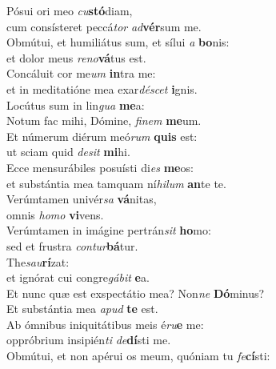 \evenverse Pósui ori meo \textit{cu}\textbf{stó}diam,~\*\\
\evenverse cum consísteret peccá\textit{tor} \textit{ad}\textbf{vér}sum me.\\
\oddverse Obmútui, et humiliátus sum, et sílui \textit{a} \textbf{bo}nis:~\*\\
\oddverse et dolor meus \textit{re}\textit{no}\textbf{vá}tus est.\\
\evenverse Concáluit cor me\textit{um} \textbf{in}tra me:~\*\\
\evenverse et in meditatióne mea exar\textit{dé}\textit{scet} \textbf{i}gnis.\\
\oddverse Locútus sum in lin\textit{gua} \textbf{me}a:~\*\\
\oddverse Notum fac mihi, Dómine, \textit{fi}\textit{nem} \textbf{me}um.\\
\evenverse Et númerum diérum meó\textit{rum} \textbf{quis} est:~\*\\
\evenverse ut sciam quid \textit{de}\textit{sit} \textbf{mi}hi.\\
\oddverse Ecce mensurábiles posuísti di\textit{es} \textbf{me}os:~\*\\
\oddverse et substántia mea tamquam ní\textit{hi}\textit{lum} \textbf{an}te te.\\
\evenverse Verúmtamen univér\textit{sa} \textbf{vá}nitas,~\*\\
\evenverse omnis \textit{ho}\textit{mo} \textbf{vi}vens.\\
\oddverse Verúmtamen in imágine pertrán\textit{sit} \textbf{ho}mo:~\*\\
\oddverse sed et frustra \textit{con}\textit{tur}\textbf{bá}tur.\\
\evenverse The\textit{sau}\textbf{rí}zat:~\*\\
\evenverse et ignórat cui congre\textit{gá}\textit{bit} \textbf{e}a.\\
\oddverse Et nunc quæ est exspectátio mea? Non\textit{ne} \textbf{Dó}minus?~\*\\
\oddverse Et substántia mea \textit{a}\textit{pud} \textbf{te} est.\\
\evenverse Ab ómnibus iniquitátibus meis é\textit{ru}\textbf{e} me:~\*\\
\evenverse oppróbrium insipién\textit{ti} \textit{de}\textbf{dí}sti me.\\
\oddverse Obmútui, et non apérui os meum, quóniam tu \textit{fe}\textbf{cí}sti:~\*\\
